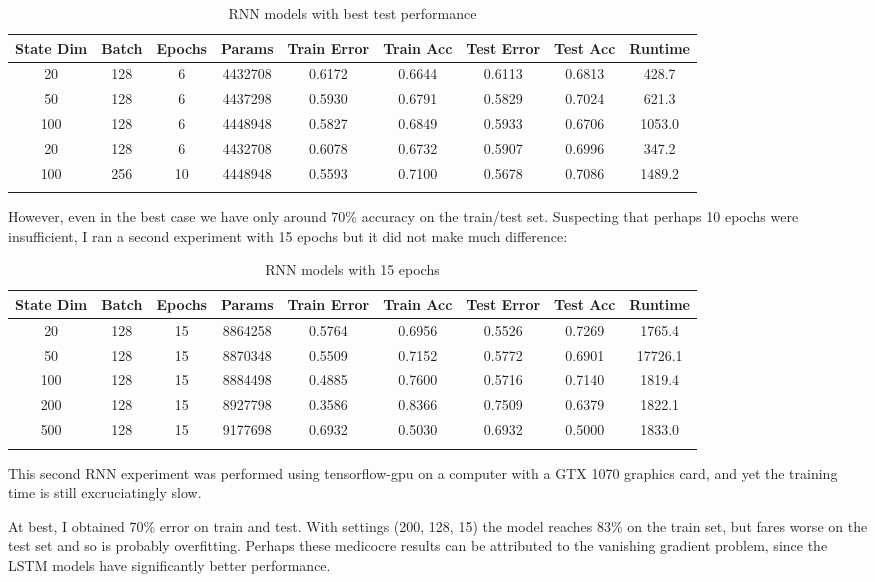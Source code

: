 \documentclass[letterpaper, 10pt]{article}
\begin{document}
\begin{longtable}{c | c | c | c | c | c | c | c | c}
State Dim & Batch & Epochs & Params & Train Error & Train Acc & Test Error & Test Acc & Runtime\\
\hline
\endhead
20 & 128 & 6 & 4432708 & 0.6172 & 0.6644 & 0.6113 & 0.6813 & 428.7 \\
50 & 128 & 6 & 4437298 & 0.5930 & 0.6791 & 0.5829 & 0.7024 & 621.3 \\
100 & 128 & 6 & 4448948 & 0.5827 & 0.6849 & 0.5933 & 0.6706 & 1053.0 \\
20 & 128 & 6 & 4432708 & 0.6078 & 0.6732 & 0.5907 & 0.6996 & 347.2 \\
100 & 256 & 10 & 4448948 & 0.5593 & 0.7100 & 0.5678 & 0.7086 & 1489.2 \\
\caption{RNN models with best test performance}
\end{longtable}

\newpage

However, even in the best case we have only around 70\% accuracy on the train/test set.
Suspecting that perhaps 10 epochs were insufficient, I ran a second experiment
with 15 epochs but it did not make much difference:

\begin{longtable}{c | c | c | c | c | c | c | c | c}
State Dim & Batch & Epochs & Params & Train Error & Train Acc & Test Error & Test Acc & Runtime\\
\hline
\endhead
20 & 128 & 15 & 8864258 & 0.5764 & 0.6956 & 0.5526 & 0.7269 & 1765.4 \\
50 & 128 & 15 & 8870348 & 0.5509 & 0.7152 & 0.5772 & 0.6901 & 17726.1 \\
100 & 128 & 15 & 8884498 & 0.4885 & 0.7600 & 0.5716 & 0.7140 & 1819.4 \\
200 & 128 & 15 & 8927798 & 0.3586 & 0.8366 & 0.7509 & 0.6379 & 1822.1 \\
500 & 128 & 15 & 9177698 & 0.6932 & 0.5030 & 0.6932 & 0.5000 & 1833.0 \\
\caption{RNN models with 15 epochs}
\end{longtable}

This second RNN experiment was performed using tensorflow-gpu on a computer with a GTX 1070
graphics card, and yet the training time is still excruciatingly slow.

At best, I obtained 70\% error on train and test. With settings (200, 128, 15)
the model reaches 83\% on the train set, but fares worse on the test set
and so is probably overfitting. Perhaps these medicocre results can be attributed
to  the vanishing gradient problem, since the LSTM models have significantly better
performance.
\end{document}
